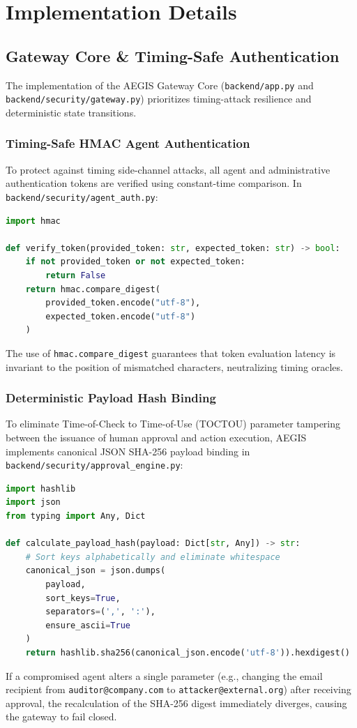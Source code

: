 \chapter{Implementation Details}
\label{chap:impl}

\section{Gateway Core \& Timing-Safe Authentication}
The implementation of the AEGIS Gateway Core (\texttt{backend/app.py} and \texttt{backend/security/gateway.py}) prioritizes timing-attack resilience and deterministic state transitions.

\subsection{Timing-Safe HMAC Agent Authentication}
To protect against timing side-channel attacks, all agent and administrative authentication tokens are verified using constant-time comparison. In \texttt{backend/security/agent\_auth.py}:
\begin{lstlisting}[language=Python, caption={Timing-Safe Token Verification}]
import hmac

def verify_token(provided_token: str, expected_token: str) -> bool:
    if not provided_token or not expected_token:
        return False
    return hmac.compare_digest(
        provided_token.encode("utf-8"),
        expected_token.encode("utf-8")
    )
\end{lstlisting}
The use of \texttt{hmac.compare\_digest} guarantees that token evaluation latency is invariant to the position of mismatched characters, neutralizing timing oracles.

\subsection{Deterministic Payload Hash Binding}
To eliminate Time-of-Check to Time-of-Use (TOCTOU) parameter tampering between the issuance of human approval and action execution, AEGIS implements canonical JSON SHA-256 payload binding in \texttt{backend/security/approval\_engine.py}:
\begin{lstlisting}[language=Python, caption={Canonical JSON SHA-256 Digest Calculation}]
import hashlib
import json
from typing import Any, Dict

def calculate_payload_hash(payload: Dict[str, Any]) -> str:
    # Sort keys alphabetically and eliminate whitespace
    canonical_json = json.dumps(
        payload,
        sort_keys=True,
        separators=(',', ':'),
        ensure_ascii=True
    )
    return hashlib.sha256(canonical_json.encode('utf-8')).hexdigest()
\end{lstlisting}
If a compromised agent alters a single parameter (e.g., changing the email recipient from \texttt{auditor@company.com} to \texttt{attacker@external.org}) after receiving approval, the recalculation of the SHA-256 digest immediately diverges, causing the gateway to fail closed.

